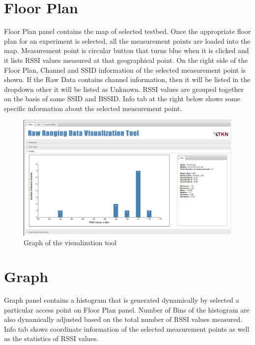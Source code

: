 \documentclass[11pt,a4paper,headinclude,footinclude,chapterprefix=on]{scrreprt}
\begin{document}
\section{Floor Plan} 
Floor Plan panel contains the map of selected testbed. Once the appropriate floor plan for an experiment is selected, all the measurement points are loaded into the map. Measurement point is circular button that turns blue when it is clicked and it lists RSSI values measured at that geographical point. On the right side of the Floor Plan, Channel and SSID information of the selected measurement point is shown. If the Raw Data contains channel information, then it will be listed in the dropdown other it will be listed as Unknown. RSSI values are grouped together on the basis of same SSID and BSSID. Info tab at the right below shows some specific information about the selected measurement point.

\begin{figure}
	[!h] \centering 
	\includegraphics[width=15cm]{Images/tool_graph.png} \caption{Graph of the visualization tool} \label{fig:tool:graph} 
\end{figure}

\section{Graph} 
Graph panel contains a histogram that is generated dynamically by selected a particular access point on Floor Plan panel. Number of Bins of the histogram are also dynamically adjusted based on the total number of RSSI values measured. Info tab shows coordinate information of the selected measurement points as well as the statistics of RSSI values.
\end{document}
